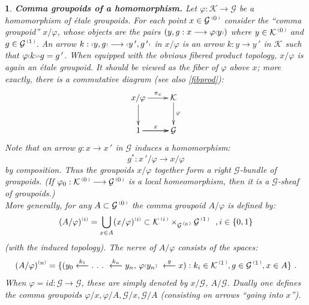 \documentclass[a4paper]{article}
\newtheorem{num}[st]{}
\newcommand{\f}{\ensuremath{\varphi}}
\newcommand{\rmap}{\longrightarrow}
\newcommand{\lmap}{\longleftarrow}
\newcommand{\Ka}{\ensuremath{\mathcal{K}}}
\newcommand{\G}{\ensuremath{\mathcal{G}}}
\newcommand{\ps}{{\raise 1pt\hbox{\tiny (}}}
\newcommand{\pd}{{\raise 1pt\hbox{\tiny )}}}
\newcommand{\nG}[1]{\ensuremath{\G^{\,\ps #1\,\pd}}}
\newcommand{\nK}[1]{\ensuremath{\Ka^{\,\ps #1\,\pd}}}
\def\compose{{\raise 1pt\hbox{$\scriptscriptstyle\circ$}}}
\begin{document}
\begin{num}
\label{comma}
\emph{
{\bf Comma groupoids of a homomorphism.} Let $\f: \Ka \rmap \G$ be a homomorphism of \'etale groupoids. For each point $x \in \nG{0}$ consider the ``comma groupoid'' $x/\f$, whose objects are the pairs $(y, g: x \rmap \f\ps y\pd)$ where $y\in \nK{0}$ and $g\in \nG{1}$. An arrow $k: \ps y, g\pd \rmap \ps y\, ', g\, '\pd$ in $x/\f$ is an arrow $k: y\rmap y\, '$ in $\Ka$ such that $\f\ps k\pd\compose g= g\, '$. When equipped with the obvious fibered product topology, $x/\f$ is again an \'etale groupoid. It should be viewed as the fiber of $\f$ above $x$; more exactly, there is a commutative diagram (see also \ref{fibprod}):
\[ \xymatrix {
 x/\f \ar[r]^-{\pi_{x}} \ar[d] & \Ka \ar[d]^-{\f} \\
 1 \ar[r] \ar[r]^-{x} & \G } \]
Note that an arrow $g: x \rmap x\, '$ in $\G$ induces a homomorphism:
\begin{equation}
\label{rel5.0}
 g^{*}: x\, '/\f \rmap x/\f 
\end{equation}
by composition. Thus the groupoids $x/\f$ together form a right $\G$-bundle of groupoids. (If $\f_{0}: \nK{0}\rmap\nG{0}$ is a local homeomorphism, then it is a $\G$-sheaf of groupoids.)\\
\hspace*{.3in} More generally, for any $A \subset \nG{0}$ the comma groupoid $A/\f$ is defined by:
\[ (A/\f)^{\ps i\pd} = \bigcup_{x\in A} (x/\f)^{\ps i\pd} \subset \nK{i} \times_{\nG{0}} \nG{1} \ \ , i \in \{ 0, 1\} \]
(with the induced topology). The nerve of $A/\f$ consists of the spaces:
\[ (A/\f)^{\ps n\pd} = \{ (y_{0} \stackrel{k_{1}}{\lmap} .\ .\ .\ \stackrel{k_{n}}{\lmap}y_{n}, \, \f\ps y_{n}\pd \ \stackrel{g}{\lmap} x): k_{i}\in \nK{1}, g\in \nG{1}, x\in A \} \ .\]
When $\f = id: \G \rmap \G$, these are simply denoted by $x/\G$, $A/\G$. Dually one defines the comma groupoids $\f/x, \f/A, \G/x, \G/A$ (consisting on arrows ``going into $x$'').
}
\end{num}
\end{document}
